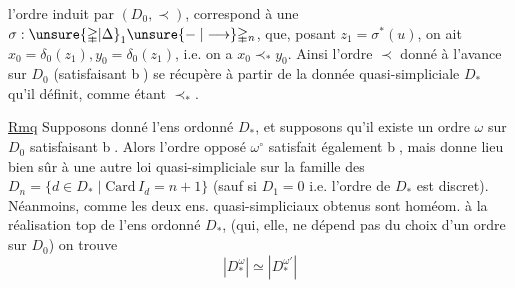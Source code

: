 l'ordre induit par $(D_0,\prec)$,  correspond à une   $\sigma:\unsure{\mathbb{\Delta}|\Delta}_1\unsure{\mathrel{-}|\longrightarrow}\mathbb{\Delta}_n$,  que, posant $z_1=\sigma^*(u)$, on ait $x_0=\delta_0(z_1),y_0=\delta_0(z_1)$, i.e. on
a $x_0\prec_*y_0$. Ainsi l'ordre $\prec$ donné à l'avance sur $D_0$ (satisfaisant \textcircled{b}) se récupère à partir de la donnée quasi-simpliciale $D_*$ qu'il définit, comme étant $\prec_*$.

\uline{Rmq} Supposons donné l'ens ordonné $D_*$,  et supposons qu'il existe un ordre $\omega$ sur $D_0$ satisfaisant \textcircled{b}. Alors l'ordre opposé $\omega^{\circ}$ satisfait également \textcircled{b}, mais donne lieu bien
sûr à une autre loi quasi-simpliciale sur la famille des $D_n=\{d\in D_*\mid\mathrm{Card}\,I_d=n+1\}$ (sauf si $D_1=0$ i.e. l'ordre de $D_*$ est discret).
Néanmoins, comme les  deux ens. quasi-simpliciaux obtenus sont  homéom. à la réalisation top  de l'ens ordonné $D_*$,
(qui, elle, ne dépend pas du choix d'un ordre sur $D_0$) on trouve   
\[
|D_*^{\omega}|\simeq|D_*^{\omega'}|
\]
